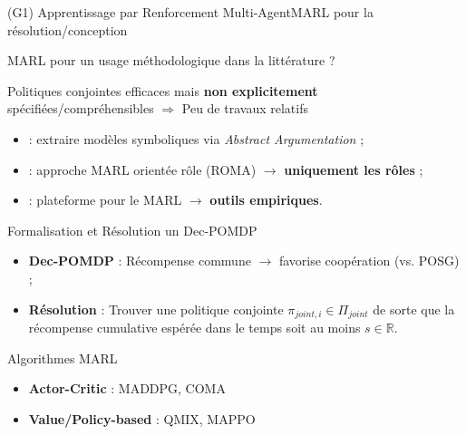 \begin{frame}{(G1) Apprentissage par Renforcement Multi-Agent}{MARL pour la résolution/conception}

    \begin{block}{MARL pour un usage méthodologique dans la littérature ?}

        Politiques conjointes efficaces mais \textbf{non explicitement} spécifiées/compréhensibles
        $\Longrightarrow$ Peu de travaux relatifs
            {\small
                \begin{itemize}
                    \item \cite{Kazhdan2020} : extraire modèles symboliques via \textit{Abstract Argumentation} ;
                    \item \cite{Wang2020} : approche MARL orientée rôle (ROMA) $\rightarrow$ \textbf{uniquement les rôles} ;
                    \item \cite{Zheng2018} : plateforme pour le MARL $\rightarrow$ \textbf{outils empiriques}.
                \end{itemize}
            }
    \end{block}

    \begin{block}{Formalisation et Résolution un Dec-POMDP}

        \begin{itemize}
            \item \textbf{Dec-POMDP} : Récompense commune $\rightarrow$ favorise coopération (vs. POSG) ;
            \item \textbf{Résolution} : Trouver une politique conjointe $\pi_{joint,i} \in \Pi_{joint}$ de sorte que la récompense cumulative espérée dans le temps soit au moins $s \in \mathbb{R}$.
        \end{itemize}


    \end{block}

    \begin{exampleblock}{Algorithmes MARL}
        {\footnotesize

            \centering
            \begin{minipage}{0.5\textwidth}
                \centering
                \begin{itemize}
                    \item \textbf{Actor-Critic} : MADDPG, COMA
                \end{itemize}
            \end{minipage}\hfill
            \begin{minipage}{0.5\textwidth}
                \centering
                \begin{itemize}
                    \item \textbf{Value/Policy-based} : QMIX, MAPPO
                \end{itemize}
            \end{minipage}\hfill
        }
    \end{exampleblock}

\end{frame}

